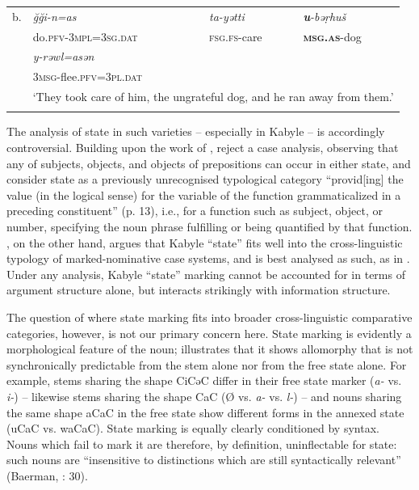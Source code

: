 \documentclass[output=paper]{langscibook}
\begin{document}
\begin{tabularx}{\textwidth}{XXXX}

\lsptoprule
b. & \textit{ğği-n=as} & \textit{ta-yətti} & \textbf{\textit{u}}\textit{{}-bəṛhuš}\\
& do.\textsc{pfv-3mpl=3sg.dat} & \textsc{fsg.fs}{}-care & \textbf{\textsc{msg.as}}{}-dog\\
& \textit{y-rəwl=asən} &  & \\
& \textsc{3msg}{}-flee.\textsc{pfv=3pl.dat} &  & \\
& \multicolumn{3}{c}{‘They took care of him, the ungrateful dog, and he ran away from them.’}\\
\lspbottomrule
\end{tabularx}
\begin{styleStandarduser}
The analysis of state in such varieties – especially in Kabyle – is accordingly controversial. Building upon the work of \citet{Galand1969}, \citet{MettouchiFrajzyngier2013} reject a case analysis, observing that any of subjects, objects, and objects of prepositions can occur in either state, and consider state as a previously unrecognised typological category “provid[ing] the value (in the logical sense) for the variable of the function grammaticalized in a preceding constituent” (p. 13), i.e., for a function such as subject, object, or number, specifying the noun phrase fulfilling or being quantified by that function. \citet{Arkadiev2015}, on the other hand, argues that Kabyle “state” fits well into the cross-linguistic typology of marked-nominative case systems, and is best analysed as such, as in \citet{Creissels2009b}. Under any analysis, Kabyle “state” marking cannot be accounted for in terms of argument structure alone, but interacts strikingly with information structure.
\end{styleStandarduser}

\begin{styleStandarduser}
The question of where state marking fits into broader cross-linguistic comparative categories, however, is not our primary concern here. State marking is evidently a morphological feature of the noun;  illustrates that it shows allomorphy that is not synchronically predictable from the stem alone nor from the free state alone. For example, stems sharing the shape CiCəC differ in their free state marker (\textit{a-} vs. \textit{i-}) – likewise stems sharing the shape CaC (Ø vs. \textit{a-} vs. \textit{l-}) – and nouns sharing the same shape aCaC in the free state show different forms in the annexed state (uCaC vs. waCaC). State marking is equally clearly conditioned by syntax. Nouns which fail to mark it are therefore, by definition, uninflectable for state: such nouns are “insensitive to distinctions which are still syntactically relevant” (Baerman, \citealt{BrownCorbett2005}: 30).
\end{styleStandarduser}
\end{document}

